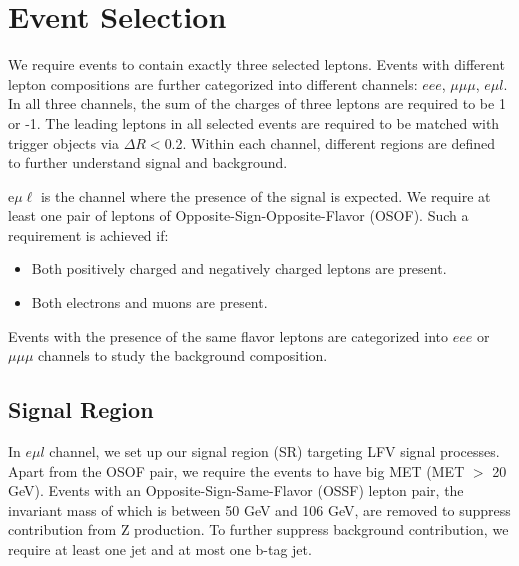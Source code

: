 \chapter{Event Selection}
\label{chap:Selection}

We require events to contain exactly three selected leptons. Events with different lepton compositions are further categorized into different channels: $eee$, $\mu\mu\mu$, $e\mu l$. In all three channels, the sum of the charges of three leptons are required to be 1 or -1. The leading leptons in all selected events are required to be matched with trigger objects via $\Delta R<$0.2. Within each channel, different regions are defined to further understand signal and background.

e$\mu\ell$ is the channel where the presence of the signal is expected. We require at least one pair of leptons of Opposite-Sign-Opposite-Flavor (OSOF). Such a requirement is achieved if:

\begin{itemize}
\item Both positively charged and negatively charged leptons are present.
\item Both electrons and muons are present.
\end{itemize}

Events with the presence of the same flavor leptons are categorized into $eee$ or $\mu\mu\mu$ channels to study the background composition. 
\section{Signal Region}
\label{sec:SR}

In $e\mu l$ channel, we set up our signal region (SR) targeting LFV signal processes. Apart from the OSOF pair, we require the events to have big MET (MET $>$ 20 GeV). Events with an Opposite-Sign-Same-Flavor (OSSF) lepton pair, the invariant mass of which is between 50 GeV and 106 GeV, are removed to suppress contribution from Z production. To further suppress background contribution, we require at least one jet and at most one b-tag jet.

